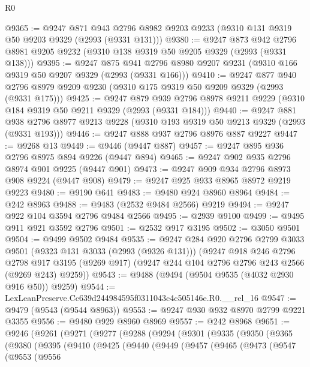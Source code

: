 \begin{lexlean}{R0}
\begin{coremodule}
@9365 := @9247
    @871
    @943
    @2796
    @8982
    @9203
    @9233
    (@9310 @131 @9319 @50 @9203 @9329 (@2993 (@9331 @131)))
@9380 := @9247
    @873
    @942
    @2796
    @8981
    @9205
    @9232
    (@9310 @138 @9319 @50 @9205 @9329 (@2993 (@9331 @138)))
@9395 := @9247
    @875
    @941
    @2796
    @8980
    @9207
    @9231
    (@9310 @166 @9319 @50 @9207 @9329 (@2993 (@9331 @166)))
@9410 := @9247
    @877
    @940
    @2796
    @8979
    @9209
    @9230
    (@9310 @175 @9319 @50 @9209 @9329 (@2993 (@9331 @175)))
@9425 := @9247
    @879
    @939
    @2796
    @8978
    @9211
    @9229
    (@9310 @184 @9319 @50 @9211 @9329 (@2993 (@9331 @184)))
@9440 := @9247
    @881
    @938
    @2796
    @8977
    @9213
    @9228
    (@9310 @193 @9319 @50 @9213 @9329 (@2993 (@9331 @193)))
@9446 := @9247 @888 @937 @2796 @8976 @887 @9227
@9447 := @9268 @13
@9449 := @9446 (@9447 @887)
@9457 := @9247 @895 @936 @2796 @8975 @894 @9226 (@9447 @894)
@9465 := @9247 @902 @935 @2796 @8974 @901 @9225 (@9447 @901)
@9473 := @9247 @909 @934 @2796 @8973 @908 @9224 (@9447 @908)
@9479 := @9247 @925 @933 @8965 @8972 @9219 @9223
@9480 := @9190 @641
@9483 := @9480 @924 @8960 @8964
@9484 := @242 @8963
@9488 := @9483 (@2532 @9484 @2566) @9219
@9494 := @9247 @922 @104 @3594 @2796 @9484 @2566
@9495 := @2939 @9100
@9499 := @9495 @911 @921 @3592 @2796
@9501 := @2532 @917 @3195
@9502 := @3050 @9501
@9504 := @9499 @9502 @9484
@9535 := @9247
    @284
    @920
    @2796
    @2799
    @3033
    @9501
    (@9323 @131 @3033 (@2993 (@9326 @131)))
    (@9247
      @918
      @246
      @2796
      @2798
      @917
      @3195
      (@9269 @917)
      (@9247 @244 @104 @2796 @2796 @243 @2566 (@9269 @243) @9259))
@9543 := @9488 (@9494 (@9504 @9535 (@4032 @2930 @916 @50)) @9259)
@9544 := LexLeanPreserve.Cc639d244984595f0311043c4c505146e.R0.__rel_16
@9547 := @9479 (@9543 (@9544 @8963))
@9553 := @9247 @930 @932 @8970 @2799 @9221 @3355
@9556 := @9480 @929 @8960 @8969
@9557 := @242 @8968
@9651 := @9246
    (@9261
      (@9271
        (@9277
          (@9288
            (@9294
              (@9301
                (@9335
                  (@9350
                    (@9365
                      (@9380
                        (@9395
                          (@9410
                            (@9425
                              (@9440
                                (@9449
                                  (@9457
                                    (@9465
                                      (@9473
                                        (@9547
                                          (@9553
                                            (@9556

\end{coremodule}
\end{lexlean}
